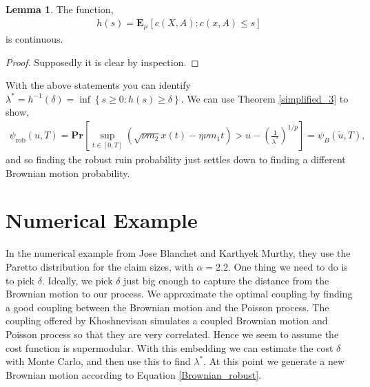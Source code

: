 \documentclass[12pt]{article}
\renewcommand{\Pr}{\textbf{Pr}}
\newcommand{\E}{\textbf{E}}
\theoremstyle{definition}
\theoremstyle{definition}
\newtheorem{lemma}{Lemma}
\theoremstyle{definition}
\begin{document}
\begin{lemma} The function,
\begin{align*}
h(s)=\E_{\mu}\left[c(X,A); c(x,A)\leq s\right]
\end{align*}
is continuous. 
\end{lemma}
\begin{proof} Supposedly it is clear by inspection.
\end{proof}

With the above statements you can identify $\lambda^*=h^{-1}(\delta)=\inf\left\{s\geq 0 : h(s)\geq \delta\right\}$. We can use Theorem \ref{simplified_3} to show,
\begin{align}
\psi_{\text{rob}}(u,T)= \Pr\left[\sup_{t\in[0,T]} \left(\sqrt{\nu m_2}x(t)-\eta \nu m_1t\right)>u -\left(\frac{1}{\lambda^*}\right)^{1/p}\right] = \psi_B(\tilde u, T),\label{Brownian_robust}
\end{align}
and so finding the robust ruin probability just settles down to finding a different Brownian motion probability. 

\section*{Numerical Example}
In the numerical example from Jose Blanchet and Karthyek Murthy, they use the Paretto distribution for the claim sizes, with $\alpha=2.2$. One thing we need to do is to pick $\delta$. Ideally, we pick $\delta$ just big enough to capture the distance from the Brownian motion to our process. We approximate the optimal coupling by finding a good coupling between the Brownian motion and the Poisson process. The coupling offered by Khoshnevisan simulates a coupled Brownian motion and Poisson process so that they are very correlated. Hence we seem to assume the cost function is supermodular. With this embedding we can estimate the cost $\delta$ with Monte Carlo, and then use this to find $\lambda^*$. At this point we generate a new Brownian motion according to Equation \ref{Brownian_robust}. 
\end{document}
